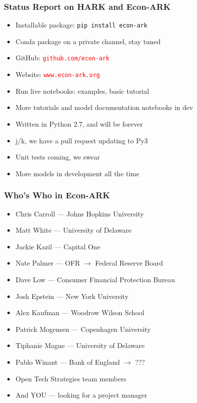 \documentclass{beamer}
\newcommand{\bi}{\begin{itemize}}
\newcommand{\ei}{\end{itemize}}
\begin{document}
\begin{frame}
\frametitle{Status Report on HARK and Econ-ARK}

\bi
\item <1-> Installable package: \texttt{pip install econ-ark}

\item <1-> Conda package on a private channel, stay tuned

\item <1-> GitHub: \textcolor{red}{\texttt{github.com/econ-ark}}

\item <2-> Website: \textcolor{red}{\texttt{www.econ-ark.org}}

\item <2-> Run live notebooks: examples, basic tutorial

\item <2-> More tutorials and model documentation notebooks in dev

\item <3-> Written in Python 2.7, and will be forever

\item <4-> j/k, we have a pull request updating to Py3

\item <5-> Unit tests coming, we swear

\item <5-> More models in development all the time
\ei

\end{frame}


\begin{frame}
\frametitle{Who's Who in Econ-ARK}

\bi
\item Chris Carroll --- Johns Hopkins University

\item Matt White --- University of Delaware

\item Jackie Kazil --- Capital One

\item Nate Palmer --- OFR $\longrightarrow$ Federal Reserve Board

\item Dave Low --- Consumer Financial Protection Bureau

\item Josh Epstein --- New York University

\item Alex Kaufman --- Woodrow Wilson School

\item Patrick Mogensen --- Copenhagen University

\item Tiphanie Magne --- University of Delaware

\item Pablo Winant --- Bank of England $\rightarrow$ ???

\item Open Tech Strategies team members

\item And YOU --- looking for a project manager
\ei

\end{frame}
\end{document}
